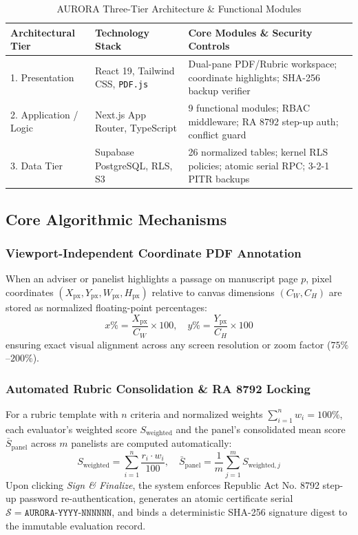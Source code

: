 \documentclass[sigplan,screen,nonacm]{acmart}
\begin{document}
\begin{table}[htbp]
  \caption{AURORA Three-Tier Architecture & Functional Modules}
  \label{tab:architecture}
  \centering
  \footnotesize
  \begin{tabular}{p{2.0cm}p{2.3cm}p{3.3cm}}
    \toprule
    \textbf{Architectural Tier} & \textbf{Technology Stack} & \textbf{Core Modules \& Security Controls} \\
    \midrule
    1. Presentation & React 19, Tailwind CSS, \texttt{PDF.js} & Dual-pane PDF/Rubric workspace; coordinate highlights; SHA-256 backup verifier \\
    2. Application / Logic & Next.js App Router, TypeScript & 9 functional modules; RBAC middleware; RA 8792 step-up auth; conflict guard \\
    3. Data Tier & Supabase PostgreSQL, RLS, S3 & 26 normalized tables; kernel RLS policies; atomic serial RPC; 3-2-1 PITR backups \\
    \bottomrule
  \end{tabular}
\end{table}

\subsection{Core Algorithmic Mechanisms}

\subsubsection{Viewport-Independent Coordinate PDF Annotation}
When an adviser or panelist highlights a passage on manuscript page $p$, pixel coordinates $(X_{\text{px}}, Y_{\text{px}}, W_{\text{px}}, H_{\text{px}})$ relative to canvas dimensions $(C_W, C_H)$ are stored as normalized floating-point percentages:
\begin{equation}
  x\% = \frac{X_{\text{px}}}{C_W} \times 100, \quad
  y\% = \frac{Y_{\text{px}}}{C_H} \times 100
\end{equation}
ensuring exact visual alignment across any screen resolution or zoom factor ($75\%$--$200\%$).

\subsubsection{Automated Rubric Consolidation & RA 8792 Locking}
For a rubric template with $n$ criteria and normalized weights $\sum_{i=1}^{n} w_i = 100\%$, each evaluator's weighted score $S_{\text{weighted}}$ and the panel's consolidated mean score $\bar{S}_{\text{panel}}$ across $m$ panelists are computed automatically:
\begin{equation}
  S_{\text{weighted}} = \sum_{i=1}^{n} \frac{r_i \cdot w_i}{100}, \quad
  \bar{S}_{\text{panel}} = \frac{1}{m}\sum_{j=1}^{m} S_{\text{weighted}, j}
\end{equation}
Upon clicking \textit{Sign \& Finalize}, the system enforces Republic Act No. 8792 step-up password re-authentication, generates an atomic certificate serial $\mathcal{S} = \texttt{AURORA-YYYY-NNNNNN}$, and binds a deterministic SHA-256 signature digest to the immutable evaluation record.
\end{document}
